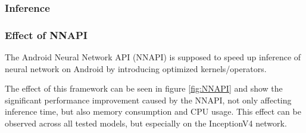 \subsubsection{Inference}

\subsubsection{Effect of NNAPI}
The Android Neural Network API (NNAPI) is supposed to speed up inference of neural network on Android by introducing optimized kernels/operators. 

The effect of this framework can be seen in figure \ref{fig:NNAPI} and show the significant performance improvement caused by the NNAPI, not only affecting inference time, but also memory consumption and CPU usage.
This effect can be observed across all tested models, but especially on the InceptionV4 network.


